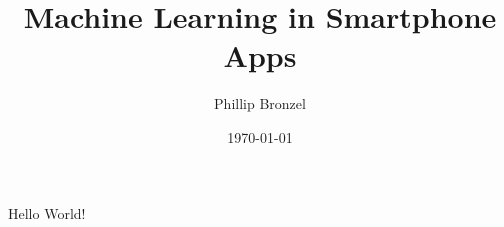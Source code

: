 \documentclass[]{article}
\title{Machine Learning in Smartphone Apps}
\date{\today}
\author{Phillip Bronzel}
\begin{document}
  \maketitle
  \newpage
  \tableofcontents
  \newpage

  Hello World!
\end{document}
